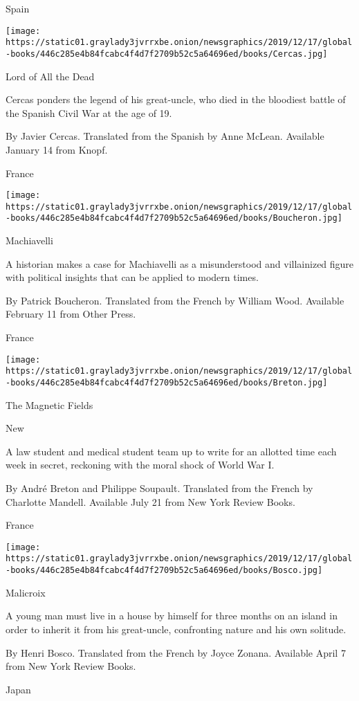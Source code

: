 Spain

\texttt{[image: https://static01.graylady3jvrrxbe.onion/newsgraphics/2019/12/17/global-books/446c285e4b84fcabc4f4d7f2709b52c5a64696ed/books/Cercas.jpg]}

Lord of All the Dead

Cercas ponders the legend of his great-uncle, who died in the bloodiest
battle of the Spanish Civil War at the age of 19.

 By Javier Cercas. Translated from the Spanish by Anne McLean. Available
January 14 from Knopf.

France

\texttt{[image: https://static01.graylady3jvrrxbe.onion/newsgraphics/2019/12/17/global-books/446c285e4b84fcabc4f4d7f2709b52c5a64696ed/books/Boucheron.jpg]}

Machiavelli

A historian makes a case for Machiavelli as a misunderstood and
villainized figure with political insights that can be applied to modern
times.

 By Patrick Boucheron. Translated from the French by William Wood.
Available February 11 from Other Press.

France

\texttt{[image: https://static01.graylady3jvrrxbe.onion/newsgraphics/2019/12/17/global-books/446c285e4b84fcabc4f4d7f2709b52c5a64696ed/books/Breton.jpg]}

The Magnetic Fields

New

A law student and medical student team up to write for an allotted time
each week in secret, reckoning with the moral shock of World War I.

 By André Breton and Philippe Soupault. Translated from the French by
Charlotte Mandell. Available July 21 from New York Review Books.

France

\texttt{[image: https://static01.graylady3jvrrxbe.onion/newsgraphics/2019/12/17/global-books/446c285e4b84fcabc4f4d7f2709b52c5a64696ed/books/Bosco.jpg]}

Malicroix

A young man must live in a house by himself for three months on an
island in order to inherit it from his great-uncle, confronting nature
and his own solitude.

 By Henri Bosco. Translated from the French by Joyce Zonana. Available
April 7 from New York Review Books.

Japan

